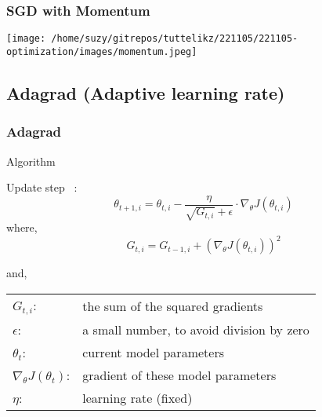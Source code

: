     \begin{frame}
      \begin{center}
      \frametitle{SGD with Momentum}
      \texttt{[image: /home/suzy/gitrepos/tuttelikz/221105/221105-optimization/images/momentum.jpeg]}
      \end{center}
    \end{frame}


    \subsection{Adagrad (Adaptive learning rate)}
    \begin{frame}
      \frametitle{Adagrad}
      \begin{block}{Algorithm}

        Update step ~\cite{duchi2011adaptive}:
        \begin{equation}    %
          \theta_{t+1,i} = \theta_{t,i} - \frac{\eta}{\sqrt{G_{t,i}}+ \epsilon} \cdot \nabla_{\theta}J(\theta_{t,i})
        \end{equation}
        where, \\
        \begin{equation}    %
          G_{t,i} = G_{t-1,i} + (\nabla_{\theta}J(\theta_{t,i}))^2
        \end{equation}
        

        \vskip 0.3cm
        and, \\
        \begin{tabular}{l l}
          $G_{t,i}$: & the sum of the squared gradients \\
          $\epsilon$: & a small number, to avoid division by zero\\
          $\theta_{t}$: & current model parameters \\
          $\nabla_{\theta}J(\theta_t)$: & gradient of these model parameters \\
          $\eta$: & learning rate (fixed)
        \end{tabular}
      \end{block}
    \end{frame}



